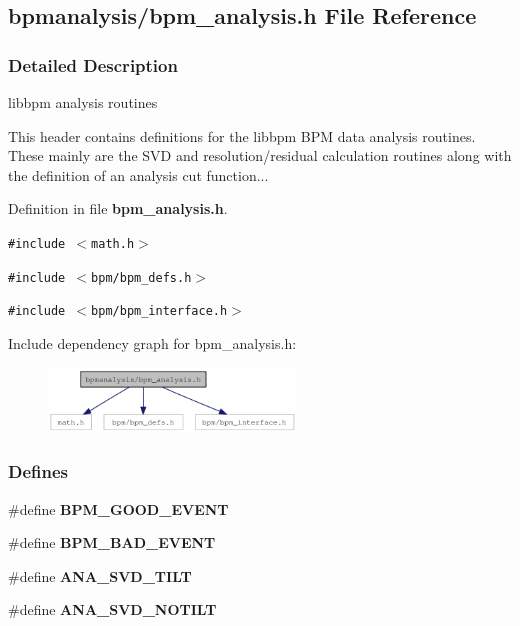 \subsection{bpmanalysis/bpm\_\-analysis.h File Reference}
\label{bpm__analysis_8h}


\subsubsection{Detailed Description}
libbpm analysis routines 

This header contains definitions for the libbpm BPM data analysis routines. These mainly are the SVD and resolution/residual calculation routines along with the definition of an analysis cut function... 

Definition in file {\bf bpm\_\-analysis.h}.

{\tt \#include $<$math.h$>$}\par
{\tt \#include $<$bpm/bpm\_\-defs.h$>$}\par
{\tt \#include $<$bpm/bpm\_\-interface.h$>$}\par


Include dependency graph for bpm\_\-analysis.h:\nopagebreak
\begin{figure}[H]
\begin{center}
\leavevmode
\includegraphics[width=186pt]{bpm__analysis_8h__incl}
\end{center}
\end{figure}
\subsubsection*{Defines}
\begin{CompactItemize}
\item 
\#define {\bf BPM\_\-GOOD\_\-EVENT}
\item 
\#define {\bf BPM\_\-BAD\_\-EVENT}
\item 
\#define {\bf ANA\_\-SVD\_\-TILT}
\item 
\#define {\bf ANA\_\-SVD\_\-NOTILT}
\end{CompactItemize}

